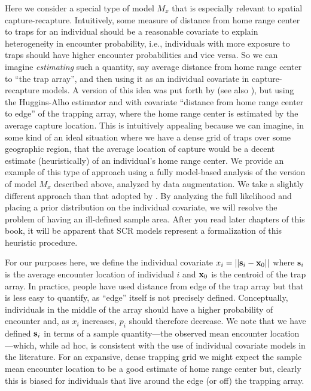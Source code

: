 Here we consider a special type of model $M_{x}$ that is
especially relevant to spatial capture-recapture.  Intuitively, some
measure of distance from home range center to traps for an individual
should be a reasonable covariate to explain heterogeneity in encounter
probability, i.e., individuals with more exposure to traps should have
higher encounter probabilities and vice versa. So we can imagine {\it
  estimating} such a quantity, say average distance from home range
center to ``the trap array'', and then using it as an individual
covariate in capture-recapture models.  A version of this idea was put
forth by \citet{boulanger_mclellan:2001} (see also \citet{ivan:2012}),
but using the Huggins-Alho estimator and with covariate ``distance
from home range center to edge'' of the trapping array, where the home
range center is estimated by the average capture location.  This is
intuitively appealing because we can imagine, in some kind of an ideal
situation where we have a dense grid of traps over some geographic
region, that the average location of capture would be a decent
estimate (heuristically) of an individual's home range center.  We
provide an example of this type of approach
using a fully model-based analysis of the version of model $M_{x}$  
 described above, 
analyzed by data augmentation. We take a slightly different approach
than that adopted by \citet{boulanger_mclellan:2001}. By analyzing the
full likelihood and placing a prior distribution on the individual
covariate, we will resolve the problem of having an ill-defined
sample area.  After you read later chapters of this book, it will be
apparent that SCR models represent a formalization of this heuristic
procedure.




For our purposes here, we define the individual covariate $x_{i} =
||{\bf s}_{i} - {\bf x}_{0}||$ where ${\bf s}_{i}$ is the average
encounter location of individual $i$ and ${\bf x}_{0}$ is the centroid
of the trap array.  In practice, people have used distance from edge
of the trap array but that is less easy to quantify, as ``edge''
itself is not precisely defined.  Conceptually, individuals in the
middle of the array should have a higher probability of encounter and,
as $x_{i}$ increases, $p_{i}$ should therefore decrease. We note that
we have defined ${\bf s}_{i}$ in terms of a sample quantity---the
observed mean encounter location---which, while ad hoc, is consistent
with the use of individual covariate models in the literature.  For an
expansive, dense trapping grid we might expect the sample mean
encounter location to be a good estimate of home range center but,
clearly this is biased for individuals that live around the edge (or
off) the trapping array.


